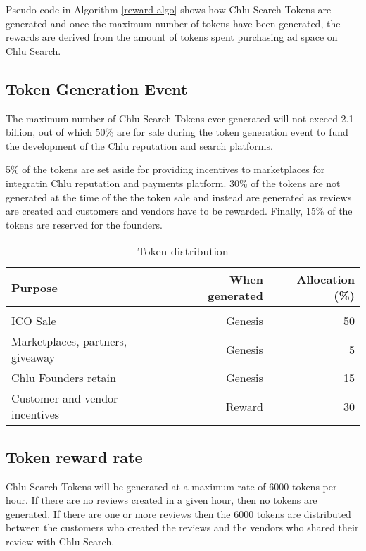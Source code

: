 \documentclass[a4paper]{article}
\begin{document}
Pseudo code in Algorithm \ref{reward-algo} shows how Chlu Search Tokens
are generated and once the maximum number of tokens have been
generated, the rewards are derived from the amount of tokens spent
purchasing ad space on Chlu Search.

\subsection{Token Generation Event}

The maximum number of Chlu Search Tokens ever generated will not
exceed 2.1 billion, out of which 50\% are for sale during the token
generation event to fund the development of the Chlu reputation and
search platforms.

5\% of the tokens are set aside for providing incentives to
marketplaces for integratin Chlu reputation and payments
platform. 30\% of the tokens are not generated at the time of the the
token sale and instead are generated as reviews are created and
customers and vendors have to be rewarded. Finally, 15\% of the tokens
are reserved for the founders.

\begin{center}
  \begin{table}
    \begin{tabular}{l r r}
      \textbf{Purpose} & \textbf{When generated} & \textbf{Allocation (\%)} \\
      \hline \\
      ICO Sale & Genesis & 50 \\
      Marketplaces, partners, giveaway  & Genesis & 5 \\
      Chlu Founders retain & Genesis & 15 \\
      Customer and vendor incentives & Reward & 30
    \end{tabular}
    \caption{Token distribution}
  \end{table}
\end{center}

\subsection{Token reward rate}

Chlu Search Tokens will be generated at a maximum rate of 6000 tokens
per hour. If there are no reviews created in a given hour, then no
tokens are generated. If there are one or more reviews then the 6000
tokens are distributed between the customers who created the reviews
and the vendors who shared their review with Chlu Search.
\end{document}
